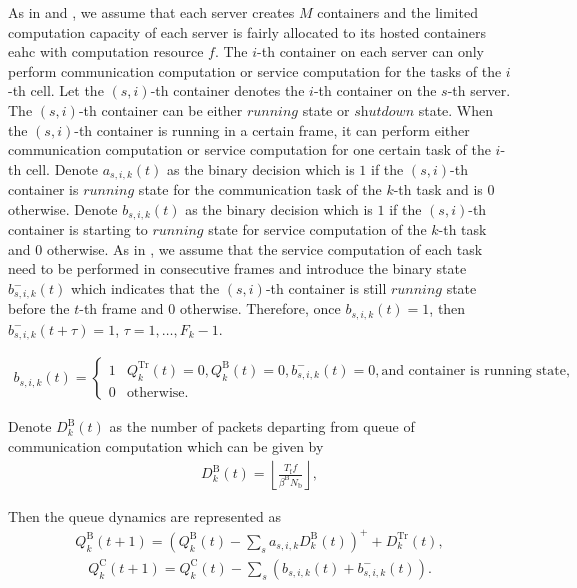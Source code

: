 \documentclass[12pt, draftclsnofoot, onecolumn]{IEEEtran}
\begin{document}
As in \cite{6582405} and \cite{8353131}, we assume that each server creates $M$ containers and the limited computation capacity of each server is fairly allocated to its hosted containers eahc with computation resource $f$. The $i$-th container on each server can only perform communication computation or service computation for the tasks of the $i$-th cell. Let the $(s,i)$-th container denotes the $i$-th container on the $s$-th server. The $(s,i)$-th container can be either $\textit{running}$ state or $\textit{shutdown}$ state. When the $(s,i)$-th container is running in a certain frame, it can perform either communication computation or service computation for one certain task of the $i$-th cell. Denote $a_{s,i,k}(t)$ as the binary decision which is $1$ if the $(s,i)$-th container is $\textit{running}$ state for the communication task of the $k$-th task and is $0$ otherwise. Denote $b_{s,i,k}(t)$ as the binary decision which is $1$ if the $(s,i)$-th container is starting to $\textit{running}$ state for service computation of the $k$-th task and $0$ otherwise. As in \cite{}, we assume that the service computation of each task need to be performed in consecutive frames and introduce the binary state $b_{s,i,k}^{-}(t)$ which indicates that the $(s,i)$-th container is still $\textit{running}$ state before the $t$-th frame and $0$ otherwise. Therefore, once $b_{s,i,k}(t)=1$, then $b_{s,i,k}^{-}(t+\tau)=1$, $\tau=1,\ldots,F_{k}-1$.

\begin{align}
	b_{s,i,k}(t)=
	\begin{cases}
		1 &Q_{k}^{\mathrm{Tr}}(t)=0,Q_{k}^{\mathrm{B}}(t)=0,b_{s,i,k}^{-}(t)=0,\text{and container is running state,}\\
		0 &\text{otherwise}.
	\end{cases}
\end{align}

Denote $D_{k}^{\mathrm{B}}(t)$ as the number of packets departing from queue of communication computation which can be given by
\begin{align}
	D_{k}^{\mathrm{B}}(t)=\left\lfloor\frac{T_{\mathrm{f}}f}{\beta^{\mathrm{B}}N_{\mathrm{b}}}\right\rfloor,
\end{align}

Then the queue dynamics are represented as
\begin{align}
	Q_{k}^{\mathrm{B}}(t+1)=(Q_{k}^{\mathrm{B}}(t)-\sum_{s}a_{s,i,k}D_{k}^{\mathrm{B}}(t))^{+}+D_{k}^{\mathrm{Tr}}(t),
\end{align}
\begin{align}
	Q_{k}^{\mathrm{C}}(t+1)=Q_{k}^{\mathrm{C}}(t)-\sum_{s}(b_{s,i,k}(t)+b_{s,i,k}^{-}(t)).
\end{align}
\end{document}
